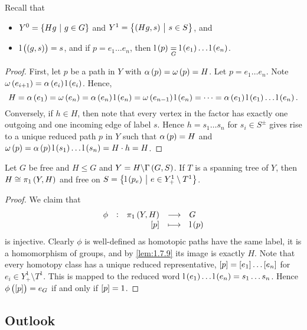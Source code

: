 Recall that
\begin{itemize}
\item $ Y^0 = \cbr{Hg \st g \in G} $ and $ Y^1 = \cbr{\br{Hg, s} \st s \in S} $, and
\item $ \l\br{\br{g, s}} = s $, and if $ p = e_1 \dots e_n $, then $ \l\br{p} \underset{G}{=} \l\br{e_1} \dots \l\br{e_n} $.
\end{itemize}

\begin{proof}
First, let $ p $ be a path in $ Y $ with $ \alpha\br{p} = \omega\br{p} = H $. Let $ p = e_1 \dots e_n $. Note $ \omega\br{e_{i + 1}} = \alpha\br{e_i}\l\br{e_i} $. Hence,
$$ H = \alpha\br{e_1} = \omega\br{e_n} = \alpha\br{e_n}\l\br{e_n} = \omega\br{e_{n - 1}}\l\br{e_n} = \dots = \alpha\br{e_1}\l\br{e_1} \dots \l\br{e_n}. $$
Conversely, if $ h \in H $, then note that every vertex in the factor has exactly one outgoing and one incoming edge of label $ s $. Hence $ h = s_1 \dots s_n $ for $ s_i \in S^\pm $ gives rise to a unique reduced path $ p $ in $ Y $ such that $ \alpha\br{p} = H $ and $ \omega\br{p} = \alpha\br{p}\l\br{s_1} \dots \l\br{s_n} = H \cdot h = H $.
\end{proof}

\begin{theorem}
Let $ G $ be free and $ H \le G $ and $ Y = H \backslash \Gamma\br{G, S} $. If $ T $ is a spanning tree of $ Y $, then $ H \cong \pi_1\br{Y, H} $ and free on $ S = \cbr{\l\br{p_e} \st e \in Y_+^1 \setminus T^1} $.
\end{theorem}

\begin{proof}
We claim that
$$ \function[\phi]{\pi_1\br{Y, H}}{G}{\sbr{p}}{\l\br{p}} $$
is injective. Clearly $ \phi $ is well-defined as homotopic paths have the same label, it is a homomorphism of groups, and by \ref{lem:1.7.9} its image is exactly $ H $. Note that every homotopy class has a unique reduced representative, $ \sbr{p} = \sbr{e_1} \dots \sbr{e_n} $ for $ e_i \in Y_+^1 \setminus T^1 $. This is mapped to the reduced word $ \l\br{e_1} \dots \l\br{e_n} = s_1 \dots s_n $. Hence $ \phi\br{\sbr{p}} = e_G $ if and only if $ \sbr{p} = 1 $.
\end{proof}

\subsection{Outlook}


